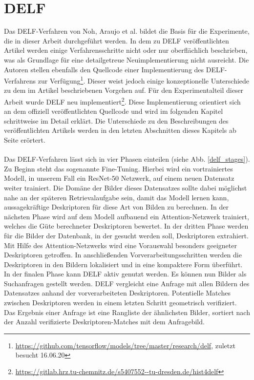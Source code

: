 \chapter{DELF}\label{delf_chapter}
Das DELF-Verfahren \cite{delf} von Noh, \mbox{Araujo} et al. bildet die Basis für die Experimente, die in dieser Arbeit durchgeführt werden.
In dem zu DELF veröffentlichten Artikel werden einige Verfahrensschritte nicht oder nur oberflächlich beschrieben, was als Grundlage für eine detailgetreue Neuimplementierung nicht ausreicht. Die Autoren stellen ebenfalls den Quellcode einer Implementierung des DELF-Verfahrens zur Verfügung\footnote{\url{https://github.com/tensorflow/models/tree/master/research/delf}, zuletzt besucht 16.06.20}. Dieser weist jedoch einige konzeptionelle Unterschiede zu dem im Artikel beschriebenen Vorgehen auf. Für den Experimentalteil dieser Arbeit wurde DELF neu implementiert\footnote{\url{https://gitlab.hrz.tu-chemnitz.de/s5407552--tu-dresden.de/hist4delf}}. Diese Implementierung orientiert sich an dem offiziell veröffentlichten Quellcode und wird im folgenden Kapitel schrittweise im Detail erklärt. Die Unterschiede zu den Beschreibungen des veröffentlichten Artikels werden in den letzten Abschnitten dieses Kapitels ab Seite \pageref{pipeline_changes}  erörtert.  
\\\\
Das DELF-Verfahren lässt sich in vier Phasen einteilen (siehe Abb. \ref{delf_stages}). Zu Beginn steht das sogenannte Fine-Tuning. Hierbei wird ein vortrainiertes Modell, in unserem Fall ein ResNet-50 Netzwerk, auf einem neuen Datensatz weiter trainiert. Die Domäne der Bilder dieses Datensatzes sollte dabei möglichst nahe an der späteren Retrievalaufgabe sein, damit das Modell lernen kann, aussagekräftige Deskriptoren für diese Art von Bilden zu berechnen. In der nächsten Phase wird auf dem Modell aufbauend ein Attention-Netzwerk trainiert, welches die Güte berechneter Deskriptoren bewertet. In der dritten Phase werden für die Bilder der Datenbank, in der gesucht werden soll, Deskriptoren extrahiert. Mit Hilfe des Attention-Netzwerks wird eine Vorauswahl besonders geeigneter Deskriptoren getroffen. In anschließenden Vorverarbeitungsschritten werden die Deskriptoren in den Bildern lokalisiert und in eine kompaktere Form überführt. In der finalen Phase kann DELF aktiv genutzt werden. Es können nun Bilder als Suchanfragen gestellt werden. DELF vergleicht eine Anfrage mit allen Bildern des Datensatzes anhand der vorverarbeiteten Deskriptoren. Potentielle Matches zwischen Deskriptoren werden in einem letzten Schritt geometrisch verifiziert. Das Ergebnis einer Anfrage ist eine Rangliste der ähnlichsten Bilder, sortiert nach der Anzahl verifizierte Deskriptoren-Matches mit dem Anfragebild.
